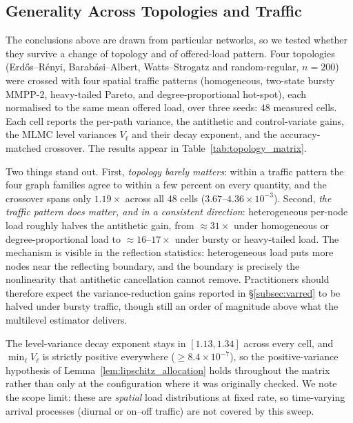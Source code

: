 \documentclass{ieeeaccess}
\begin{document}
\subsection{Generality Across Topologies and Traffic}
\label{subsec:topology_matrix}

The conclusions above are drawn from particular networks, so we tested whether they survive a
change of topology and of offered-load pattern. Four topologies (Erd\H{o}s--R\'enyi,
Barab\'{a}si--Albert, Watts--Strogatz and random-regular, $n{=}200$) were crossed with four
spatial traffic patterns (homogeneous, two-state bursty MMPP-2, heavy-tailed Pareto, and
degree-proportional hot-spot), each normalised to the same mean offered load, over three seeds:
48 measured cells. Each cell reports the per-path variance, the antithetic and control-variate
gains, the MLMC level variances $V_\ell$ and their decay exponent, and the accuracy-matched
crossover. The results appear in Table~\ref{tab:topology_matrix}.

Two things stand out. First, \emph{topology barely matters}: within a traffic pattern the four
graph families agree to within a few percent on every quantity, and the crossover spans only
$1.19\times$ across all 48 cells ($3.67$--$4.36\times10^{-3}$). Second, \emph{the traffic
pattern does matter, and in a consistent direction}: heterogeneous per-node load roughly halves
the antithetic gain, from ${\approx}31\times$ under homogeneous or degree-proportional load to
${\approx}16$--$17\times$ under bursty or heavy-tailed load. The mechanism is visible in the
reflection statistics: heterogeneous load puts more nodes near the reflecting boundary, and the
boundary is precisely the nonlinearity that antithetic cancellation cannot remove. Practitioners
should therefore expect the variance-reduction gains reported in
\S\ref{subsec:varred} to be halved under bursty traffic, though still an order of magnitude
above what the multilevel estimator delivers.

The level-variance decay exponent stays in $[1.13, 1.34]$ across every cell, and
$\min_\ell V_\ell$ is strictly positive everywhere ($\geq8.4\times10^{-7}$), so the
positive-variance hypothesis of Lemma~\ref{lem:lipschitz_allocation} holds throughout the
matrix rather than only at the configuration where it was originally checked. We note the scope
limit: these are \emph{spatial} load distributions at fixed rate, so time-varying arrival
processes (diurnal or on--off traffic) are not covered by this sweep.
\end{document}
